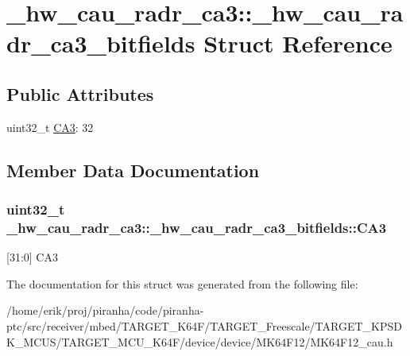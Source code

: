 \hypertarget{struct__hw__cau__radr__ca3_1_1__hw__cau__radr__ca3__bitfields}{}\section{\+\_\+hw\+\_\+cau\+\_\+radr\+\_\+ca3\+:\+:\+\_\+hw\+\_\+cau\+\_\+radr\+\_\+ca3\+\_\+bitfields Struct Reference}
\label{struct__hw__cau__radr__ca3_1_1__hw__cau__radr__ca3__bitfields}
\subsection*{Public Attributes}
\begin{DoxyCompactItemize}
\item 
uint32\+\_\+t \hyperlink{struct__hw__cau__radr__ca3_1_1__hw__cau__radr__ca3__bitfields_a43684abf986b73e389b0cd9bad8e2543}{C\+A3}\+: 32
\end{DoxyCompactItemize}


\subsection{Member Data Documentation}
\subsubsection[{\texorpdfstring{C\+A3}{CA3}}]{\setlength{\rightskip}{0pt plus 5cm}uint32\+\_\+t \+\_\+hw\+\_\+cau\+\_\+radr\+\_\+ca3\+::\+\_\+hw\+\_\+cau\+\_\+radr\+\_\+ca3\+\_\+bitfields\+::\+C\+A3}\hypertarget{struct__hw__cau__radr__ca3_1_1__hw__cau__radr__ca3__bitfields_a43684abf986b73e389b0cd9bad8e2543}{}\label{struct__hw__cau__radr__ca3_1_1__hw__cau__radr__ca3__bitfields_a43684abf986b73e389b0cd9bad8e2543}
\mbox{[}31\+:0\mbox{]} C\+A3 

The documentation for this struct was generated from the following file\+:\begin{DoxyCompactItemize}
\item 
/home/erik/proj/piranha/code/piranha-\/ptc/src/receiver/mbed/\+T\+A\+R\+G\+E\+T\+\_\+\+K64\+F/\+T\+A\+R\+G\+E\+T\+\_\+\+Freescale/\+T\+A\+R\+G\+E\+T\+\_\+\+K\+P\+S\+D\+K\+\_\+\+M\+C\+U\+S/\+T\+A\+R\+G\+E\+T\+\_\+\+M\+C\+U\+\_\+\+K64\+F/device/device/\+M\+K64\+F12/M\+K64\+F12\+\_\+cau.\+h\end{DoxyCompactItemize}
